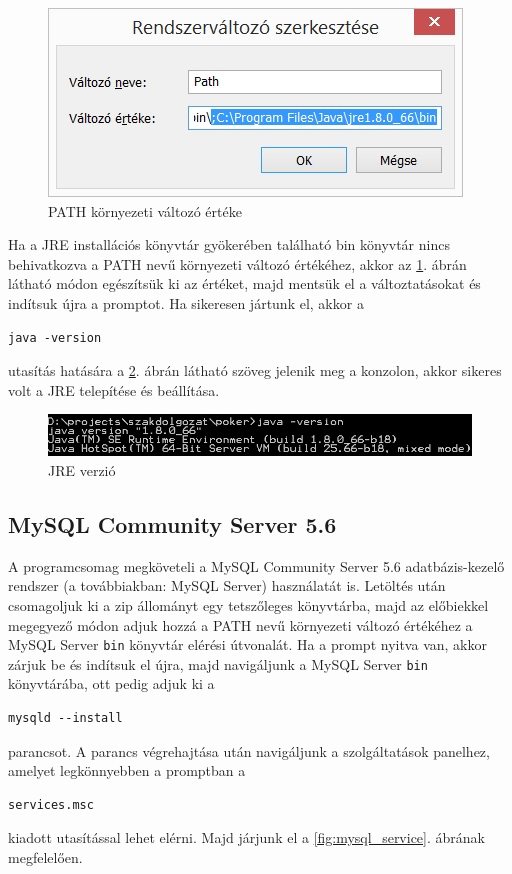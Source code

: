 \begin{figure}[h!]
  \caption{PATH környezeti változó értéke}
  \label{fig:path_env}
  \centering
    \includegraphics{user-documentation/images/path_env.jpg}
\end{figure}

Ha a JRE installációs könyvtár gyökerében található bin könyvtár nincs behivatkozva a PATH nevű környezeti változó értékéhez, akkor az \ref{fig:path_env}. ábrán látható módon egészítsük ki az értéket, majd mentsük el a változtatásokat és indítsuk újra a promptot. Ha sikeresen jártunk el, akkor a

\begin{verbatim}
java -version
\end{verbatim}
utasítás hatására a \ref{fig:jre_version}. ábrán látható szöveg jelenik meg a konzolon, akkor sikeres volt a JRE telepítése és beállítása.
\begin{figure}[h!]
  \caption{JRE verzió}
  \label{fig:jre_version}
  \centering
    \includegraphics{user-documentation/images/java_version.jpg}
\end{figure}
 
 \subsection{MySQL Community Server 5.6}
 A programcsomag megköveteli a MySQL Community Server 5.6 \cite{mysqlsite} adatbázis-kezelő rendszer (a továbbiakban: MySQL Server) használatát is. Letöltés után csomagoljuk ki a zip állományt egy tetszőleges könyvtárba, majd az előbiekkel megegyező módon adjuk hozzá a PATH nevű környezeti változó értékéhez a MySQL Server \texttt{bin} könyvtár elérési útvonalát. Ha a prompt nyitva van, akkor zárjuk be és indítsuk el újra, majd navigáljunk a MySQL Server \texttt{bin} könyvtárába, ott pedig adjuk ki a
 \begin{verbatim}
mysqld --install
\end{verbatim}
parancsot. A parancs végrehajtása után navigáljunk a szolgáltatások panelhez, amelyet legkönnyebben a promptban a
 \begin{verbatim}
services.msc
\end{verbatim}
kiadott utasítással lehet elérni. Majd járjunk el a \ref{fig:mysql_service}. ábrának megfelelően. 

